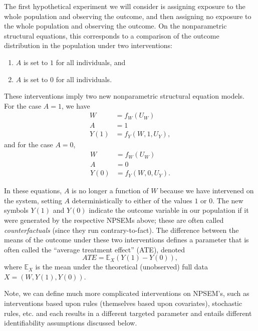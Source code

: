 \documentclass[
  12pt, krantz2,
]{book}
\providecommand{\tightlist}{%
  \setlength{\itemsep}{0pt}\setlength{\parskip}{0pt}}
\theoremstyle{definition}
\theoremstyle{definition}
\theoremstyle{definition}
\newcommand{\1}{\mathbbm{1}}
\begin{document}
The first hypothetical experiment we will consider is assigning exposure to the
whole population and observing the outcome, and then assigning no exposure to
the whole population and observing the outcome. On the nonparametric structural
equations, this corresponds to a comparison of the outcome distribution in the
population under two interventions:

\begin{enumerate}
\def\labelenumi{\arabic{enumi}.}
\tightlist
\item
  \(A\) is set to \(1\) for all individuals, and
\item
  \(A\) is set to \(0\) for all individuals.
\end{enumerate}

These interventions imply two new nonparametric structural equation models. For
the case \(A = 1\), we have
\begin{align*}
  W &= f_W(U_W) \\
  A &= 1 \\
  Y(1) &= f_Y(W, 1, U_Y),
\end{align*}
and for the case \(A=0\),
\begin{align*}
  W &= f_W(U_W) \\
  A &= 0 \\
  Y(0) &= f_Y(W, 0, U_Y).
\end{align*}

In these equations, \(A\) is no longer a function of \(W\) because we have
intervened on the system, setting \(A\) deterministically to either of the values
\(1\) or \(0\). The new symbols \(Y(1)\) and \(Y(0)\) indicate the outcome variable in
our population if it were generated by the respective NPSEMs above; these are
often called \emph{counterfactuals} (since they run contrary-to-fact). The difference
between the means of the outcome under these two interventions defines a
parameter that is often called the ``average treatment effect'' (ATE), denoted
\begin{equation}\label{eqn:ate}
  ATE = \mathbb{E}_X(Y(1)-Y(0)),
\end{equation}
where \(\mathbb{E}_X\) is the mean under the theoretical (unobserved) full data
\(X = (W, Y(1), Y(0))\).

Note, we can define much more complicated interventions on NPSEM's, such as
interventions based upon rules (themselves based upon covariates), stochastic
rules, etc. and each results in a different targeted parameter and entails
different identifiability assumptions discussed below.
\end{document}
